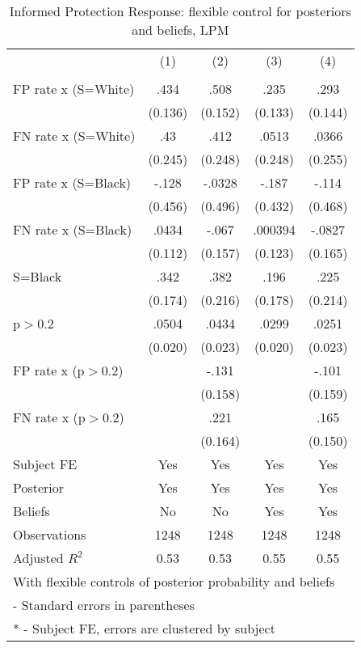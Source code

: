 \begin{table}[htbp]\centering
\caption{Informed Protection Response: flexible control for posteriors and beliefs, LPM}
\begin{tabular}{l*{4}{c}}
\hline\hline
                &\multicolumn{1}{c}{(1)}&\multicolumn{1}{c}{(2)}&\multicolumn{1}{c}{(3)}&\multicolumn{1}{c}{(4)}\\
                &\multicolumn{1}{c}{}&\multicolumn{1}{c}{}&\multicolumn{1}{c}{}&\multicolumn{1}{c}{}\\
\hline
FP rate x (S=White)&     .434&     .508&     .235&     .293\\
                &  (0.136)&  (0.152)&  (0.133)&  (0.144)\\
FN rate x (S=White)&      .43&     .412&    .0513&    .0366\\
                &  (0.245)&  (0.248)&  (0.248)&  (0.255)\\
FP rate x (S=Black)&    -.128&   -.0328&    -.187&    -.114\\
                &  (0.456)&  (0.496)&  (0.432)&  (0.468)\\
FN rate x (S=Black)&    .0434&    -.067&  .000394&   -.0827\\
                &  (0.112)&  (0.157)&  (0.123)&  (0.165)\\
S=Black         &     .342&     .382&     .196&     .225\\
                &  (0.174)&  (0.216)&  (0.178)&  (0.214)\\
p$>$0.2         &    .0504&    .0434&    .0299&    .0251\\
                &  (0.020)&  (0.023)&  (0.020)&  (0.023)\\
FP rate x (p$>$0.2)&         &    -.131&         &    -.101\\
                &         &  (0.158)&         &  (0.159)\\
FN rate x (p$>$0.2)&         &     .221&         &     .165\\
                &         &  (0.164)&         &  (0.150)\\
Subject FE      &      Yes&      Yes&      Yes&      Yes\\
Posterior       &      Yes&      Yes&      Yes&      Yes\\
Beliefs         &       No&       No&      Yes&      Yes\\
\hline
Observations    &     1248&     1248&     1248&     1248\\
Adjusted \(R^{2}\)&     0.53&     0.53&     0.55&     0.55\\
\hline\hline
\multicolumn{5}{l}{\footnotesize With flexible controls of posterior probability and beliefs}\\
\multicolumn{5}{l}{\footnotesize * - Standard errors in parentheses}\\
\multicolumn{5}{l}{\footnotesize ** - Subject FE, errors are clustered by subject}\\
\end{tabular}
\end{table}
